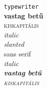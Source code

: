 \documentclass{article}
\begin{document}
\texttt{typewriter}\\
\textbf{vastag betű}\\
\textsc{kiskapitális}\\
\textit{italic}\\
\textsl{slanted}\\
\textsf{sans serif}\\


\emph{\textit{italic}}\\
\emph{\textbf{vastag betű}}\\
\emph{\textsc{kiskapitális}}\\
\end{document}
